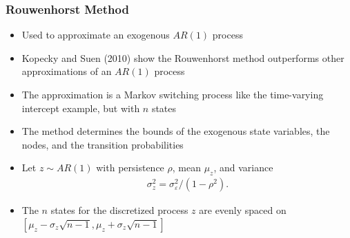 \documentclass[11pt]{beamer}
\begin{document}
\begin{frame}\frametitle{Rouwenhorst Method}

\begin{itemize}\setlength{\itemsep}{8pt}
  \item<1-|handout:1> Used to approximate an exogenous $AR(1)$ process
  \item <2-|handout:1>Kopecky and Suen (2010) show the Rouwenhorst method outperforms other approximations of an $AR(1)$ process
  \item <3-|handout:1>The approximation is a Markov switching process like the time-varying intercept example, but with $n$ states
  \item <4-|handout:1>The method determines the bounds of the exogenous state variables, the nodes, and the transition probabilities
  \item <5-|handout:1>Let $z\sim AR(1)$ with persistence $\rho$, mean $\mu_z$, and variance %
  \begin{gather*}
    \sigma_z^2 = \sigma_\varepsilon^2/(1-\rho^2).
  \end{gather*}
  \item   <6-|handout:1>The $n$ states for the discretized process $z$ are evenly spaced on $[\mu_z-\sigma_z\sqrt{n-1},\mu_z+\sigma_z\sqrt{n-1}]$
\end{itemize}

\end{frame}

\end{document}
